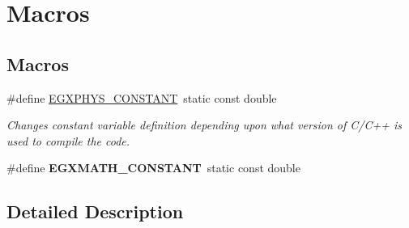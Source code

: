\hypertarget{group___e_g_x_phys-_constants-_macros}{}\section{Macros}
\label{group___e_g_x_phys-_constants-_macros}
\subsection*{Macros}
\begin{DoxyCompactItemize}
\item 
\mbox{\label{group___e_g_x_phys-_constants-_macros_ga76980d288494ce1714c9ac68a95ba702}} 
\#define \mbox{\hyperlink{group___e_g_x_phys-_constants-_macros_ga76980d288494ce1714c9ac68a95ba702}{E\+G\+X\+P\+H\+Y\+S\+\_\+\+C\+O\+N\+S\+T\+A\+NT}}~static const double
\begin{DoxyCompactList}\small\item\em Changes constant variable definition depending upon what version of C/\+C++ is used to compile the code. \end{DoxyCompactList}\item 
\mbox{\label{group___e_g_x_phys-_constants-_macros_gaa1f3bca2c5fd1df9bdda8c706123d800}} 
\#define {\bfseries E\+G\+X\+M\+A\+T\+H\+\_\+\+C\+O\+N\+S\+T\+A\+NT}~static const double
\end{DoxyCompactItemize}


\subsection{Detailed Description}
